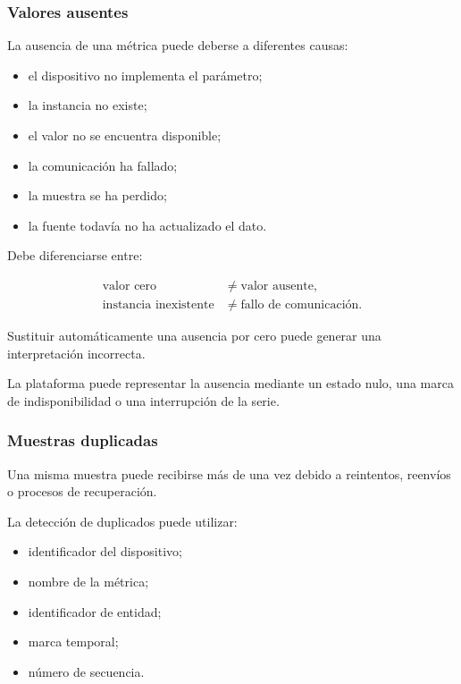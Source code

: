 \subsubsection*{Valores ausentes}

La ausencia de una métrica puede deberse a diferentes causas:

\begin{itemize}
    \item el dispositivo no implementa el parámetro;

    \item la instancia no existe;

    \item el valor no se encuentra disponible;

    \item la comunicación ha fallado;

    \item la muestra se ha perdido;

    \item la fuente todavía no ha actualizado el dato.
\end{itemize}

Debe diferenciarse entre:

\[
\begin{aligned}
    \text{valor cero}
    &\neq
    \text{valor ausente},\\
    \text{instancia inexistente}
    &\neq
    \text{fallo de comunicación}.
\end{aligned}
\]

Sustituir automáticamente una ausencia por cero puede generar una
interpretación incorrecta.

La plataforma puede representar la ausencia mediante un estado nulo, una
marca de indisponibilidad o una interrupción de la serie.


\subsubsection*{Muestras duplicadas}

Una misma muestra puede recibirse más de una vez debido a reintentos,
reenvíos o procesos de recuperación.

La detección de duplicados puede utilizar:

\begin{itemize}
    \item identificador del dispositivo;

    \item nombre de la métrica;

    \item identificador de entidad;

    \item marca temporal;

    \item número de secuencia.
\end{itemize}


